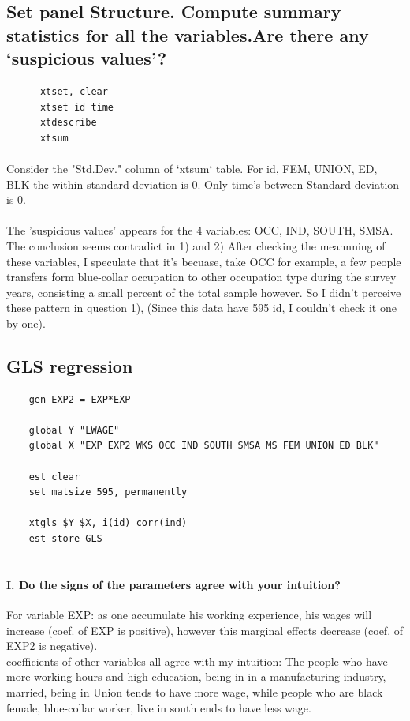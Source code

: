 \documentclass{article}
\begin{document}
\subsection{Set panel Structure. Compute summary statistics for all the variables.Are there any ‘suspicious values’?}
\begin{lstlisting}
      xtset, clear
      xtset id time
      xtdescribe
      xtsum
\end{lstlisting}

	\paragraph{} Consider the "Std.Dev." column of `xtsum` table. 
	For id, FEM, UNION, ED, BLK the within standard deviation is 0.
	Only time's between Standard deviation is 0.
	\paragraph{}  The 'suspicious values' appears for the 4 variables:
	OCC, IND, SOUTH, SMSA. The conclusion seems contradict in 1) and 2)
	After checking the meannning of these variables, 
	I speculate that it's becuase, take OCC for example, 
	a few people transfers form blue-collar occupation to other 
	occupation type during the survey years, 
	consisting a small percent of the total sample however. So I didn't
	perceive these pattern in question 1), 
	(Since this data have 595 id, I couldn't check it one by one).





\subsection{GLS regression}
\begin{lstlisting}
    gen EXP2 = EXP*EXP
    
    global Y "LWAGE"
    global X "EXP EXP2 WKS OCC IND SOUTH SMSA MS FEM UNION ED BLK"
    
    est clear
    set matsize 595, permanently
    
    xtgls $Y $X, i(id) corr(ind) 
    est store GLS
    
\end{lstlisting}
\paragraph{ I. Do the signs of the parameters agree with your intuition? \\} 
For variable EXP: as one accumulate his working experience, his wages will increase (coef. of EXP is positive), 
however this marginal effects decrease (coef. of EXP2 is negative).\\
coefficients of other variables all agree with my intuition: 
The people who 
have more working hours and high education,
being in in a manufacturing industry, 
married,
being in Union
tends to have more wage, while people who are
black
female,
blue-collar worker, 
live in south
ends to have less wage.
\end{document}
